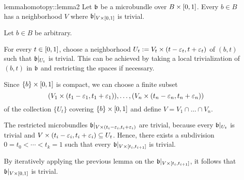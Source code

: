 \begin{mystatement}{lemma}{homotopy::lemma2}
    Let $\bb$ be a microbundle over $B \times{} [0, 1]$.
    Every $b \in B$ has a neighborhood $V$ where $\bb[\cyl{V}]$ is trivial.
\end{mystatement}

\begin{myproof}
    Let $b \in B$ be arbitrary.

    For every $t \in [0, 1]$, choose a neighborhood $U_t := V_t \times (t - \varepsilon{}_t, t + \varepsilon{}_t)$ of $(b, t)$ such that $\bb[U_t]$ is trivial.
    This can be achieved by taking a local trivialization of $(b, t)$ in $\bb$ and restricting the spaces if necessary.

    Since $\{b\} \times{} [0, 1]$ is compact, we can choose a finite subset
    \[ (V_1 \times (t_1 - \varepsilon{}_1, t_1 + \varepsilon{}_1)), \dots, (V_n \times (t_n - \varepsilon{}_n, t_n + \varepsilon{}_n)) \]
    of the collection $\{U_t\}$ covering $\{b\} \times [0, 1]$ and define $V = V_1 \cap \dots \cap V_n$.

    The restricted microbundles $\bb[V \cross (t_i - \eps_i, t_i + \eps_i)]$ are trivial, because every $\bb[U_t]$ is trivial and $V \times (t_i - \varepsilon{}_i, t_i + \varepsilon{}_i) \subseteq{} U_t$.
    Hence, there exists a subdivision $0 = t_0 < \cdots < t_k = 1$ such that every $\bb[V \cross [t_{i}, t_{i + 1}]]$ is trivial.
    
    By iteratively applying the previous lemma on the $\bb[V \cross [t_i, t_{i + 1}]]$, it follows that $\bb[\cyl{V}]$ is trivial.
\end{myproof}